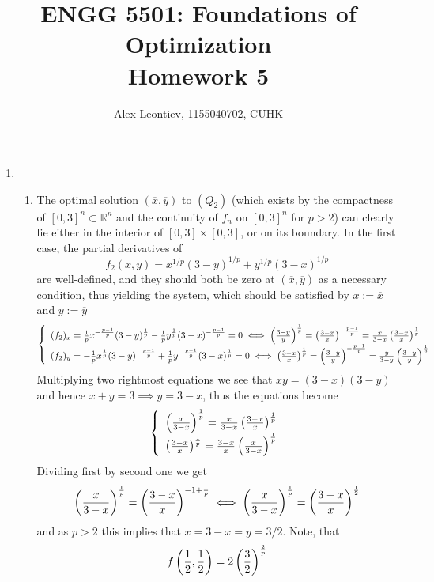 \documentclass[8pt]{article} %
\title{ ENGG 5501: Foundations of Optimization\\Homework 5}
\author{Alex Leontiev, 1155040702, CUHK}
\begin{document}
\maketitle
\begin{enumerate}[label=\bfseries Problem \arabic*.]
	\item\begin{enumerate}[label=(\alph*)]
			\item The optimal solution $(\overline{x},\overline{y})$
				to $(Q_2)$ (which exists by the compactness of $[0,3]^n\subset\mathbb{R}^n$ and 
				the continuity of $f_n$ on $[0,3]^n$ for $p>2$) can clearly lie either in the interior of $[0,3]\times[0,3]$,
				or on its boundary. In the first case, the partial derivatives of 
				\[f_2(x,y)=x^{1/p}(3-y)^{1/p}+y^{1/p}(3-x)^{1/p}\]
				are well-defined, and they should both be zero at $(\overline{x},\overline{y})$ as a necessary condition,
				thus yielding the system, which should be satisfied by $x:=\overline{x}$ and $y:=\overline{y}$
				\[\left\{\begin{array}{l}
					(f_2)_x=\frac{1}{p}x^{-\frac{p-1}{p}}(3-y)^{\frac{1}{p}}
					-\frac{1}{p}y^{\frac{1}{p}}(3-x)^{-\frac{p-1}{p}}=0\iff 
					\left(\frac{3-y}{y}\right)^{\frac{1}{p}}=\left(\frac{3-x}{x}\right)^{-\frac{p-1}{p}}=
					{\frac{x}{3-x}}\left(\frac{3-x}{x}\right)^{\frac{1}{p}}\\
					(f_2)_y=-\frac{1}{p}x^{\frac{1}{p}}(3-y)^{-\frac{p-1}{p}}+\frac{1}{p}y^{-\frac{p-1}{p}}(3-x)^{\frac{1}{p}}=0
					\iff\left(\frac{3-x}{x}\right)^{\frac{1}{p}}=\left(\frac{3-y}{y}\right)^{-\frac{p-1}{p}}=
					{\frac{y}{3-y}}\left(\frac{3-y}{y}\right)^{\frac{1}{p}}\\
				\end{array}\right.\]
				Multiplying two rightmost equations we see that $xy=(3-x)(3-y)$ and hence $x+y=3\implies y=3-x$,
				thus the equations become
				\[\left\{\begin{array}{l}
					\left(\frac{x}{3-x}\right)^{\frac{1}{p}}={\frac{x}{3-x}}\left(\frac{3-x}{x}\right)^{\frac{1}{p}}\\
					\left(\frac{3-x}{x}\right)^{\frac{1}{p}}={\frac{3-x}{x}}\left(\frac{x}{3-x}\right)^{\frac{1}{p}}\\
				\end{array}\right.\]
				Dividing first by second one we get
				\[\left(\frac{x}{3-x}\right)^{\frac{1}{p}}=\left(\frac{3-x}{x}\right)^{-1+\frac{1}{p}}\iff
				\left(\frac{x}{3-x}\right)^{\frac{1}{p}}=\left(\frac{3-x}{x}\right)^{\frac{1}{2}}
				\]
				and as $p>2$ this implies that $x=3-x=y=3/2$. Note, that 
				\[f\left(\frac{1}{2},\frac{1}{2}\right)=2\left(\frac{3}{2}\right)^{\frac{2}{p}}\]


\end{enumerate}
\end{enumerate}
\end{document}
